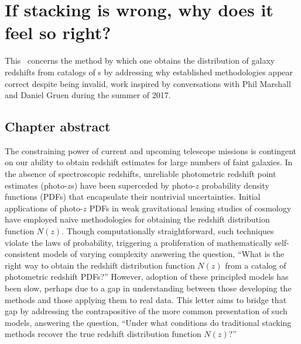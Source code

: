 \renewcommand{\chapid}{pedant}



\chapter{ If stacking is wrong, why does it feel so right?  }

This \paper\ concerns the method by which one obtains the distribution of galaxy redshifts from catalogs of \pzpdf s by addressing why established methodologies appear correct despite being invalid, work inspired by conversations with Phil Marshall and Daniel Gruen during the summer of 2017.

\section*{Chapter abstract}

The constraining power of current and upcoming telescope missions is contingent on our ability to obtain redshift estimates for large numbers of faint galaxies.
In the absence of spectroscopic redshifts, unreliable photometric redshift point estimates (photo-$z$s) have been superceded by photo-$z$ probability density functions (PDFs) that encapsulate their nontrivial uncertainties.
Initial applications of photo-$z$ PDFs in weak gravitational lensing studies of cosmology have employed naive methodologies for obtaining the redshift distribution function $N(z)$.
Though computationally straightforward, such techniques violate the laws of probability, triggering a proliferation of mathematically self-consistent models of varying complexity answering the question, ``What is the right way to obtain the redshift distribution function $N(z)$ from a catalog of photometric redshift PDFs?''
However, adoption of these principled models has been slow, perhaps due to a gap in understanding between those developing the methods and those applying them to real data.
This letter aims to bridge that gap by addressing the contrapositive of the more common presentation of such models, answering the question, ``Under what conditions do traditional stacking methods recover the true redshift distribution function $N(z)$?''

